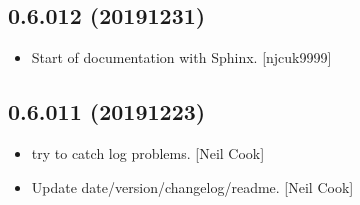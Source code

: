\documentclass[a4paper,10pt,english]{report}
\begin{document}
\subsection{0.6.012 (2019\sphinxhyphen{}12\sphinxhyphen{}31)}
\label{\detokenize{misc/changelog:id26}}\begin{itemize}
\item {} 
Start of documentation with Sphinx. {[}njcuk9999{]}

\end{itemize}


\subsection{0.6.011 (2019\sphinxhyphen{}12\sphinxhyphen{}23)}
\label{\detokenize{misc/changelog:id27}}\begin{itemize}
\item {} 
 \sphinxhyphen{} try to catch log problems. {[}Neil Cook{]}

\item {} 
Update date/version/changelog/readme. {[}Neil Cook{]}

\end{itemize}
\end{document}
